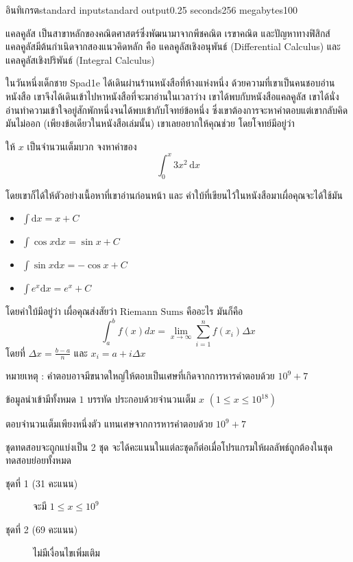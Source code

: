 \documentclass[11pt,a4paper]{article}
\begin{document}
\begin{problem}{อินทิเกรต}{standard input}{standard output}{0.25 seconds}{256 megabytes}{100}

แคลคูลัส เป็นสาขาหลักของคณิตศาสตร์ซึ่งพัฒนามาจากพีชคณิต เรขาคณิต และปัญหาทางฟิสิกส์ แคลคูลัสมีต้นกำเนิดจากสองแนวคิดหลัก คือ แคลคูลัสเชิงอนุพันธ์ (Differential Calculus) และ แคลคูลัสเชิงปริพันธ์ (Integral Calculus)

ในวันหนึ่งเด็กชาย Spad1e ได้เดินผ่านร้านหนังสือที่ห้างแห่งหนึ่ง ด้วยความที่เขาเป็นคนชอบอ่านหนังสือ เขาจึงได้เดินเข้าไปหาหนังสือที่จะมาอ่านในเวลาว่าง เขาได้พบกับหนังสือแคลคูลัส เขาได้นั่งอ่านทำความเข้าใจอยู่สักพักหนึ่งจนได้พบเข้ากับโจทย์ข้อหนึ่ง ซึ่งเขาต้องการจะหาคำตอบแต่เขากลับคิดมันไม่ออก (เพียงข้อเดียวในหนังสือเล่มนั้น) เขาเลยอยากให้คุณช่วย โดยโจทย์มีอยู่ว่า

ให้ $x$ เป็นจำนวนเต็มบวก จงหาค่าของ \[\int_0^x 3x^2\, \mathrm{d}x\]

โดยเขาก็ได้ให้ตัวอย่างเนื้อหาที่เขาอ่านก่อนหน้า และ คำใบ้ที่เขียนไว้ในหนังสือมาเผื่อคุณจะได้ใช้มัน
\begin{itemize}
    \item $\int \mathrm{d}x=x+C$
    \item $\int \cos x\mathrm{d}x=\sin x+C$
    \item $\int \sin x\mathrm{d}x=-\cos x+C$
    \item $\int e^x\mathrm{d}x=e^x+C$
\end{itemize}

โดยคำใบ้มีอยู่ว่า  เผื่อคุณส่งสัยว่า $\mathrm{Riemann}$ $\mathrm{Sums}$ คืออะไร มันก็คือ \[\int_a^b f(x)dx=\lim_{x\to\infty}\sum_{i=1}^n f(x_i)\Delta x\] โดยที่ $\Delta x=\frac{b-a}{n}$ และ $x_i=a+i\Delta x$

หมายเหตุ : คำตอบอาจมีขนาดใหญ่ให้ตอบเป็นเศษที่เกิดจากการหารคำตอบด้วย $10^9 + 7$

\InputFile
ข้อมูลนำเข้ามีทั้งหมด $1$ บรรทัด
ประกอบด้วยจำนวนเต็ม $x$ $(1 \leq x \leq 10^{18})$

\OutputFile
ตอบจำนวนเต็มเพียงหนึ่งตัว แทนเศษจากการหารคำตอบด้วย $10^9+7$

\Scoring
ชุดทดสอบจะถูกแบ่งเป็น 2 ชุด จะได้คะแนนในแต่ละชุดก็ต่อเมื่อโปรแกรมให้ผลลัพธ์ถูกต้องในชุดทดสอบย่อยทั้งหมด

\begin{description}

\item[ชุดที่ 1 (31 คะแนน)] จะมี $ 1 \leq x \leq 10^9$

\item[ชุดที่ 2 (69 คะแนน)] ไม่มีเงื่อนไขเพิ่มเติม 

\end{description}

\Examples

\begin{example}
%
%
\end{example}

\end{problem}
\end{document}
